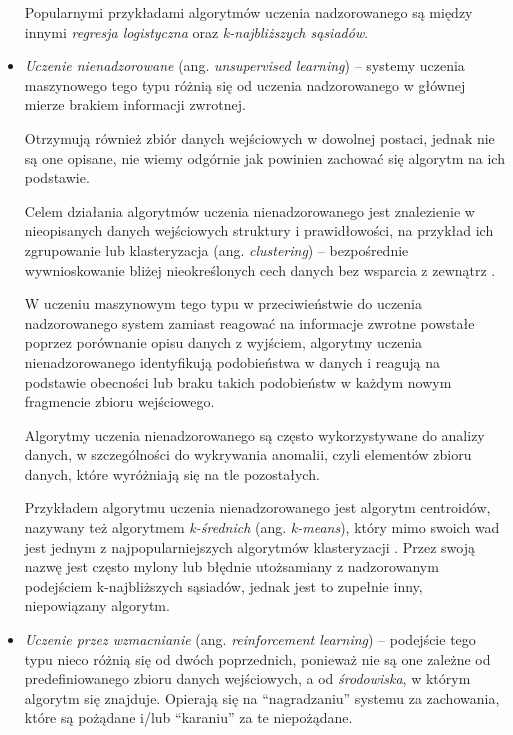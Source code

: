 \begin{itemize}
        Popularnymi przykładami algorytmów uczenia nadzorowanego są między innymi \emph{regresja logistyczna} oraz \emph{k-najbliższych sąsiadów}.


  \item \emph{Uczenie nienadzorowane} (ang. \emph{unsupervised learning}) --
        systemy uczenia maszynowego tego typu różnią się od uczenia nadzorowanego w głównej mierze brakiem informacji zwrotnej.

        Otrzymują również zbiór danych wejściowych w dowolnej postaci, jednak nie są one opisane, nie wiemy odgórnie jak powinien zachować się algorytm na ich podstawie.

        Celem działania algorytmów uczenia nienadzorowanego jest znalezienie w nieopisanych danych wejściowych struktury i prawidłowości, na przykład ich zgrupowanie lub klasteryzacja (ang. \emph{clustering}) -- bezpośrednie wywnioskowanie bliżej nieokreślonych cech danych bez wsparcia z zewnątrz \cite{hastie2009unsupervised}.

        W uczeniu maszynowym tego typu w przeciwieństwie do uczenia nadzorowanego system zamiast reagować na informacje zwrotne powstałe poprzez porównanie opisu danych z wyjściem, algorytmy uczenia nienadzorowanego identyfikują podobieństwa w danych i reagują na podstawie obecności lub braku takich podobieństw w każdym nowym fragmencie zbioru wejściowego.

        Algorytmy uczenia nienadzorowanego są często wykorzystywane do analizy danych, w szczególności do wykrywania anomalii, czyli elementów zbioru danych, które wyróżniają się na tle pozostałych.

        Przykładem algorytmu uczenia nienadzorowanego jest algorytm centroidów, nazywany też algorytmem \emph{k-średnich} (ang. \emph{k-means}), który mimo swoich wad jest jednym z najpopularniejszych algorytmów klasteryzacji \cite{ahmed2020k}.
        Przez swoją nazwę jest często mylony lub błędnie utożsamiany z nadzorowanym podejściem k-najbliższych sąsiadów, jednak jest to zupełnie inny, niepowiązany algorytm.

  \item \emph{Uczenie przez wzmacnianie} (ang. \emph{reinforcement learning}) --
        podejście tego typu nieco różnią się od dwóch poprzednich, ponieważ nie są one zależne od predefiniowanego zbioru danych wejściowych, a od \emph{środowiska}, w którym algorytm się znajduje.
        Opierają się na ``nagradzaniu'' systemu za zachowania, które są pożądane i/lub ``karaniu'' za te niepożądane.


\end{itemize}

